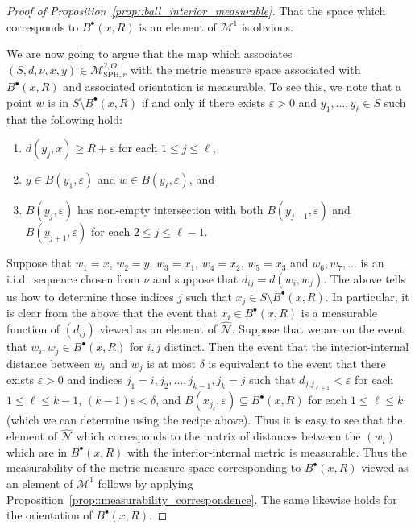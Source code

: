 \documentclass[JEP,XML,SOM,Unicode]{cedram}
\let\mathcal\mathscr
\newcommand{\sbullet}{{\scriptscriptstyle\bullet}}
\let\epsilon\varepsilon
\theoremstyle{plain}
\numberwithin{theorem}{section}
\theoremstyle{definition}
\newcommand\gmsspacer{{\mathcal M}_{\mathrm{SPH},r}}
\newcommand\mmspace{{\mathcal M}}
\newcommand{\matrixmspace}{\mathcal N}
\let\wh\widehat
\newcommand{\fb}[2]{B^\sbullet(#1,#2)}
\begin{document}
\begin{proof}[Proof of Proposition~\ref{prop::ball_interior_measurable}]
That the space which corresponds to $\fb{x}{R}$ is an element of $\mmspace^1$ is obvious.

We are now going to argue that the map which associates $(S,d,\nu,x,y) \in \gmsspacer^{2,O}$ with the metric measure space associated with $\fb{x}{R}$ and associated orientation is measurable. To see this, we note that a point $w$ is in $S \setminus \fb{x}{R}$ if and only if there exists $\epsilon > 0$ and $y_1,\ldots,y_\ell \in S$ such that the following hold:
\begin{enumerate}
\item $d(y_j,x) \geq R+\epsilon$ for each $1 \leq j \leq \ell$,
\item $y \in B(y_1,\epsilon)$ and $w \in B(y_\ell,\epsilon)$, and
\item $B(y_j,\epsilon)$ has non-empty intersection with both $B(y_{j-1},\epsilon)$ and $B(y_{j+1},\epsilon)$ for each $2 \leq j \leq \ell-1$.
\end{enumerate}
Suppose that $w_1=x$, $w_2 = y$, $w_3=x_1$, $w_4=x_2$, $w_5 = x_3$ and $w_6,w_7,\ldots$ is an i.i.d.\ sequence chosen from $\nu$ and suppose that $d_{ij} = d(w_i,w_j)$. The above tells us how to determine those indices $j$ such that $x_j \in S \setminus \fb{x}{R}$. In particular, it is clear from the above that the event that $x_i \in \fb{x}{R}$ is a measurable function of $(d_{ij})$ viewed as an element of $\wh{\matrixmspace}$. Suppose that we are on the event that $w_i,w_j \in \fb{x}{R}$ for $i,j$ distinct. Then the event that the interior-internal distance between $w_i$ and $w_j$ is at most $\delta$ is equivalent to the event that there exists $\epsilon > 0$ and indices $j_1 = i,j_2,\ldots,j_{k-1},j_k=j$ such that $d_{j_\ell j_{\ell+1}} < \epsilon$ for each $1 \leq \ell \leq k-1$, $(k-1) \epsilon < \delta$, and $B(x_{j_\ell},\epsilon) \subseteq \fb{x}{R}$ for each $1 \leq \ell \leq k$ (which we can determine using the recipe above). Thus it is easy to see that the element of $\wh{\matrixmspace}$ which corresponds to the matrix of distances between the $(w_i)$ which are in $\fb{x}{R}$ with the interior-internal metric is measurable. Thus the measurability of the metric measure space corresponding to $\fb{x}{R}$ viewed as an element of $\mmspace^1$ follows by applying Proposition~\ref{prop::measurability_correspondence}. The same likewise holds for the orientation of $\fb{x}{R}$.


\end{proof}
\end{document}
